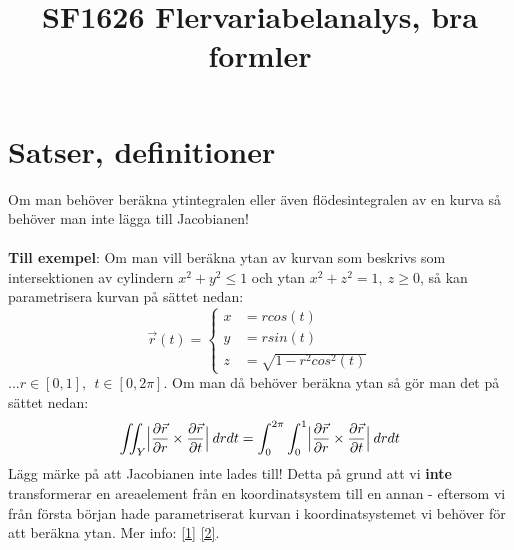 \documentclass{report}
\title{\Huge{SF1626 Flervariabelanalys, bra formler}}
\author{\huge{}}
\date{}
\begin{document}
\maketitle
\newpage
\pagebreak

\chapter{Satser, definitioner}
{
	Om man behöver beräkna ytintegralen eller även flödesintegralen av en kurva så behöver man inte lägga till Jacobianen!\\\\
	
	\textbf{Till exempel}: Om man vill beräkna ytan av kurvan som beskrivs som intersektionen av cylindern $ x^2+y^2 \le 1$ och ytan $x^2+z^2 = 1, \: z \ge 0$, så kan parametrisera kurvan på sättet nedan:
	\begin{equation*}
	\vec{r}(t) =
	\begin{cases}
		x &= rcos(t)\\
		y &= rsin(t)\\
		z &= \sqrt{1-r^2cos^2(t)}
	\end{cases}
	\end{equation*}
	...$r \in [0,1], \:\: t \in [0, 2\pi]$. Om man då behöver beräkna ytan så gör man det på sättet nedan:
	\begin{equation*}
		\iint_Y \Bigl| \frac{\partial \vec{r}}{\partial r} \times \frac{\partial \vec{r}}{\partial t} \Bigr| \: drdt = \int_0^{2\pi}\int_0^1 \Bigl| \frac{\partial \vec{r}}{\partial r} \times \frac{\partial \vec{r}}{\partial t} \Bigr| \: drdt
	\end{equation*}
	Lägg märke på att Jacobianen inte lades till! Detta på grund att vi \textbf{inte} transformerar en areaelement från en koordinatsystem till en annan - eftersom vi från första början hade parametriserat kurvan i koordinatsystemet vi behöver för att beräkna ytan. Mer info: \href{https://math.stackexchange.com/questions/2388245/why-is-there-no-jacobian-in-the-definition-of-the-surface-integral-iint-ufds}{[1]} \href{https://math.stackexchange.com/a/2332951}{[2]}. 
}
\end{document}
